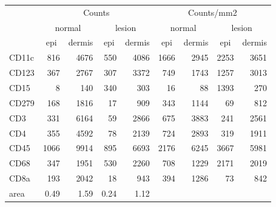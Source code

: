 \begin{tabular}{lrrrr|rrrr}
   \hline
 
         \multicolumn{1}{c}{} & \multicolumn{4}{c|}{Counts} & \multicolumn{4}{c}{Counts/mm2} \\ 
         \multicolumn{1}{c}{} & \multicolumn{2}{c}{normal} & \multicolumn{2}{c|}{lesion} & \multicolumn{2}{c}{normal} & \multicolumn{2}{c}{lesion}  \\ 
         \multicolumn{1}{c}{} & \multicolumn{1}{c}{epi} & dermis & \multicolumn{1}{c}{epi} & \multicolumn{1}{c|}{dermis} & \multicolumn{1}{c}{epi} & dermis & \multicolumn{1}{c}{epi} & dermis  \\ 
         \hline
    CD11c & 816 & 4676 & 550 & 4086 & 1666 & 2945 & 2253 & 3651 \\ 
  CD123 & 367 & 2767 & 307 & 3372 & 749 & 1743 & 1257 & 3013 \\ 
  CD15 & 8 & 140 & 340 & 303 & 16 & 88 & 1393 & 270 \\ 
  CD279 & 168 & 1816 & 17 & 909 & 343 & 1144 & 69 & 812 \\ 
  CD3 & 331 & 6164 & 59 & 2866 & 675 & 3883 & 241 & 2561 \\ 
  CD4 & 355 & 4592 & 78 & 2139 & 724 & 2893 & 319 & 1911 \\ 
  CD45 & 1066 & 9914 & 895 & 6693 & 2176 & 6245 & 3667 & 5981 \\ 
  CD68 & 347 & 1951 & 530 & 2260 & 708 & 1229 & 2171 & 2019 \\ 
  CD8a & 193 & 2042 & 18 & 943 & 394 & 1286 & 73 & 842 \\ 
  area & 0.49 & 1.59 & 0.24 & 1.12 &    &    &    &    \\ 
   \hline
\end{tabular}
